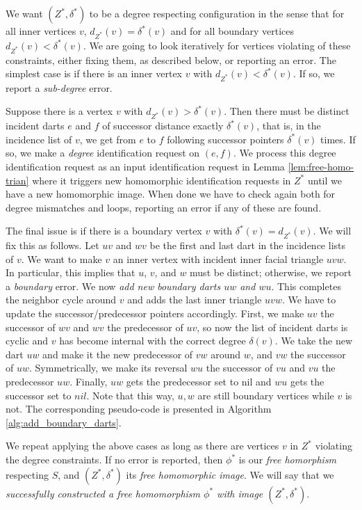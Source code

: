 \documentclass[10pt,a4paper]{article}
\def\nil{\textit{nil}}
\begin{document}
We want $(Z^*,\delta^*)$ to be a degree respecting
configuration in the sense that for all inner vertices $v$, $d_{Z^*}(v)=\delta^*(v)$ and for all boundary vertices 
$d_{Z^*}(v)<\delta^*(v)$. We are going to look iteratively for vertices violating of these constraints, either fixing them, 
as described below,
or reporting an error. The simplest case is if there is an inner vertex $v$ with $d_{Z^*}(v)<\delta^*(v)$. If so, we report a \emph{sub-degree} error.


Suppose there is a vertex
$v$ with $d_{Z^*}(v)>\delta^*(v)$.
Then there must
be distinct 
incident darts $e$ and $f$ of successor
distance exactly $\delta^*(v)$, that is, in the incidence list of $v$, we get from $e$ to $f$ following successor pointers $\delta^*(v)$ times. If so, we make a \emph{degree} identification request on $(e,f)$. We process this degree identification request as an input identification request in Lemma \ref{lem:free-homo-trian} where it  triggers new homomorphic identification requests in $Z^*$ until we have a new homomorphic image. When done we have to check again both for degree mismatches and loops, reporting an error if any of these are found. 

The final issue is if
there is a boundary vertex $v$ with $\delta^*(v)=d_{Z^*}(v)$. We will fix this as follows. Let $uv$ and $wv$ be the first and last dart in the incidence lists of $v$. We want
to make $v$ an inner vertex with incident inner facial triangle $uvw$. In particular,
this implies that $u$, $v$, and $w$ must be distinct; otherwise, we report a \emph{boundary} error. We now \emph{add new boundary darts $uw$ and $wu$}.
This completes the neighbor cycle around $v$ and adds the last inner triangle $uvw$. We have to update the successor/predecessor pointers accordingly.  First, we make $uv$ the successor of $wv$ and $wv$ the predecessor of $uv$, so now the
list of incident darts is cyclic and $v$ has become internal with the correct degree $\delta(v)$. We take the new dart $uw$ and make it
the new predecessor of $vw$ around $w$, and $vw$ the successor of $uw$. Symmetrically, we make its reversal
$wu$ the successor of $vu$
and $vu$ the predecessor  $uw$. Finally, $uw$ gets the predecessor set to nil and $wu$ gets the successor set to $\nil$.
Note that this way, $u,w$ are still boundary vertices while $v$ is not.
The corresponding pseudo-code is presented in Algorithm \ref{alg:add_boundary_darts}.

We repeat applying the above cases as long
as there are vertices $v$ in $Z^*$ violating the degree constraints. 
If no error is reported,
then $\phi^*$ is our \emph{free homorphism} respecting $S$, and $(Z^*,\delta^*)$ its \emph{free homomorphic image}.  We will say that we \emph{successfully constructed a free homomorphism $\phi^*$ with  image $(Z^*,\delta^*)$}. 
\end{document}
